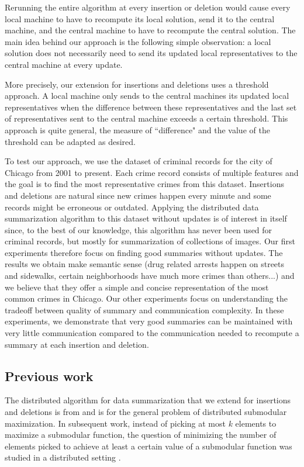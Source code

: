 	Rerunning the entire algorithm at every insertion or deletion would cause every local machine to have to recompute its local solution, send it to the central machine, and the central machine to have to recompute the central solution. The main idea behind our approach is the following simple observation: a local solution does not necessarily need to send its updated local representatives to the central machine at every update.
	
	More precisely, our extension for insertions and deletions uses a threshold approach. A local machine only sends to the central machines its updated local representatives when the difference between these representatives and the last set of representatives sent to the central machine exceeds a certain threshold. This approach is quite general, the measure of ``difference" and the value of the threshold can be adapted as desired.
	
	To test our approach, we use the dataset of criminal records for the city of Chicago from 2001 to present. Each crime record consists of multiple features and the goal is to find the most representative crimes from this dataset. Insertions and deletions are natural since new crimes happen every minute and some records might be erroneous or outdated. Applying the distributed data summarization algorithm to this dataset without updates is of interest in itself since, to the best of our knowledge, this algorithm has never been used for criminal records, but mostly for summarization of collections of images. Our first experiments therefore focus on finding good summaries without updates. The results we obtain make semantic sense (drug related arrests happen on streets and sidewalks, certain neighborhoods have much more crimes than others...) and we believe that they offer a simple and concise representation of the most common crimes in Chicago. Our other experiments focus on understanding the tradeoff between quality of summary and communication complexity. In these experiments, we demonstrate that very good summaries can be maintained with very little communication compared to the communication needed to recompute a summary at each insertion and deletion.
	
	\subsection{Previous work}
	
	The distributed algorithm for data summarization that we extend for insertions and deletions is from \citet{mirzasoleiman2013distributed} and is for the general problem of distributed submodular maximization. In subsequent work, instead of picking at most $k$ elements to maximize a submodular function, the question of minimizing the number of elements picked to achieve at least a certain value of a submodular function was studied in a distributed setting \cite{mirzasoleiman2015distributed}. 
	
